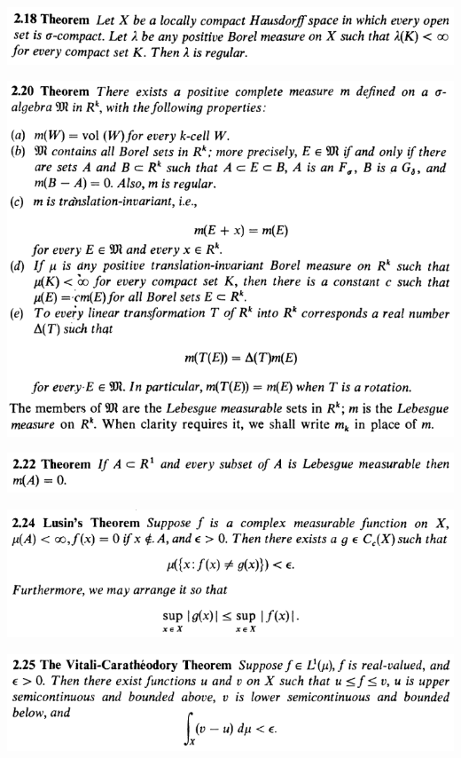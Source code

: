 \documentclass[12pt]{article}
\begin{document}
		\begin{center}
		\includegraphics{2ponto18}
		\end{center}

		\begin{center}
		\includegraphics{2ponto20}
		\end{center}

		\begin{center}
		\includegraphics{2ponto22}
		\end{center}

		\begin{center}
		\includegraphics{2ponto24}
		\end{center}

		\begin{center}
		\includegraphics{2ponto25}
		\end{center}
\end{document}
